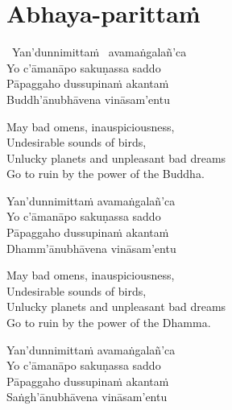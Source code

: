 \suttaRef{[Thai]}



\section{Abhaya-parittaṁ}
\label{abhaya-parittam}

\begin{pali-hangtogether}
  \anglebracketleft\ \hspace{-0.5mm}Yan'dunnimittaṁ \hspace{-0.5mm}\anglebracketright\ avamaṅgalañ'ca\\
  Yo c'āmanāpo sakuṇassa saddo\\
  Pāpaggaho dussupinaṁ akantaṁ\\
  Buddh'ānubhāvena vināsam'entu
\end{pali-hangtogether}

\begin{english-verses}
  May bad omens, inauspiciousness,\\
  Undesirable sounds of birds,\\
  Unlucky planets and unpleasant bad dreams\\
  Go to ruin by the power of the Buddha.
\end{english-verses}

\begin{pali-hang-continued}
  Yan'dunnimittaṁ avamaṅgalañ'ca\\
  Yo c'āmanāpo sakuṇassa saddo\\
  Pāpaggaho dussupinaṁ akantaṁ\\
  Dhamm'ānubhāvena vināsam'entu
\end{pali-hang-continued}

\begin{english-verses}
  May bad omens, inauspiciousness,\\
  Undesirable sounds of birds,\\
  Unlucky planets and unpleasant bad dreams\\
  Go to ruin by the power of the Dhamma.
\end{english-verses}

\begin{pali-hang-continued}
  Yan'dunnimittaṁ avamaṅgalañ'ca\\
  Yo c'āmanāpo sakuṇassa saddo\\
  Pāpaggaho dussupinaṁ akantaṁ\\
  Saṅgh'ānubhāvena vināsam'entu
\end{pali-hang-continued}

